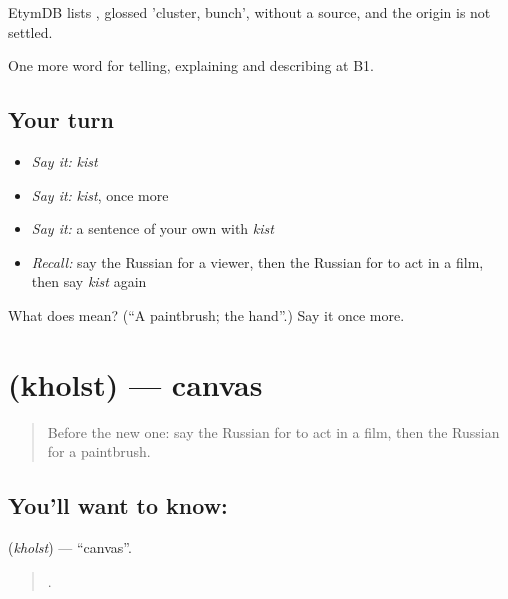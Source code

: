 \begin{cousinweb}
EtymDB lists \emph{}, glossed 'cluster, bunch', without a source, and the origin is not settled.
\end{cousinweb}

\begin{grammarlens}[title={What you've built}]
One more word for telling, explaining and describing at B1.
\end{grammarlens}

\subsection*{Your turn}
\begin{itemize}
\raggedright
  \item \emph{Say it:} \emph{kist}
  \item \emph{Say it:} \emph{kist}, once more
  \item \emph{Say it:} a sentence of your own with \emph{kist}
  \item \emph{Recall:} say the Russian for a viewer, then the Russian for to act in a film, then say \emph{kist} again
\end{itemize}

\begin{tcolorbox}[breakable,colback=teal!4,colframe=teal!35!black,title={Before you move on}]
What does  mean? (\textquotedblleft{}A paintbrush; the hand\textquotedblright{}.) Say it once more.
\end{tcolorbox}
\section[\texorpdfstring{\ru{холст} (kholst)}{холст (kholst)}]{ (kholst) — canvas}

\label{lesson:RU-C521-kholst}



\begin{quote}
Before the new one: say the Russian for to act in a film, then the Russian for a paintbrush.
\end{quote}

\subsection*{You'll want to know: }
\textbf{} (\emph{kholst}) — \textquotedblleft{}canvas\textquotedblright{}.

\begin{quote}
    .
\end{quote}

